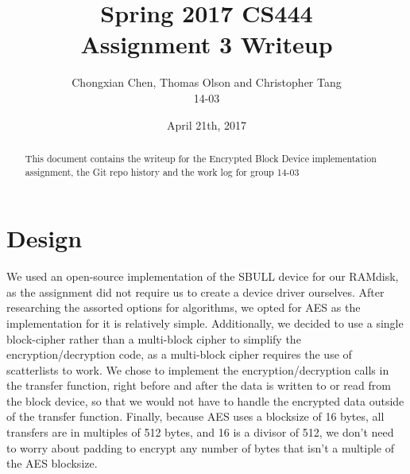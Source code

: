 \documentclass[10pt,onecolumn,journal,draftclsnofoot,letterpaper]{IEEEtran}
\begin{document}
\begin{titlepage}
  \title{Spring 2017 CS444\\Assignment 3 Writeup}
  \author{Chongxian Chen, Thomas Olson and Christopher Tang\\14-03}
  \date{April 21th, 2017}
  \maketitle
  \vspace{4cm}
  \begin{abstract}
  \noindent This document contains the writeup for the Encrypted Block Device implementation assignment, the Git repo history and the work log for group 14-03
 \end{abstract}
    \bigskip
    \bigskip
    \bigskip
    \bigskip
    \bigskip



\end{titlepage}

\section{Design}
We used an open-source implementation of the SBULL device for our RAMdisk, as the assignment did not require us to create a device driver ourselves. After researching the assorted options for algorithms, we opted for AES as the implementation for it is relatively simple. Additionally, we decided to use a single block-cipher rather than a multi-block cipher to simplify the encryption/decryption code, as a multi-block cipher requires the use of scatterlists to work. We chose to implement the encryption/decryption calls in the transfer function, right before and after the data is written to or read from the block device, so that we would not have to handle the encrypted data outside of the transfer function. Finally, because AES uses a blocksize of 16 bytes, all transfers are in multiples of 512 bytes, and 16 is a divisor of 512, we don't need to worry about padding to encrypt any number of bytes that isn't a multiple of the AES blocksize.
\end{document}
